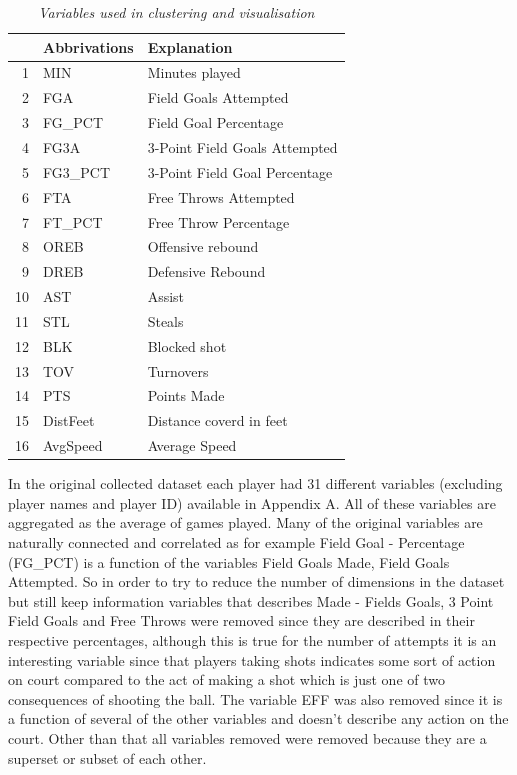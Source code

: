 \documentclass{article}
\begin{document}
\begin{table}[ht]
\centering
\begin{tabular}{rll}
  \hline
 & \textbf{Abbrivations} & \textbf{Explanation} \\ 
  \hline
1 & MIN & Minutes played \\ 
  2 & FGA & Field Goals Attempted \\ 
  3 & FG\_PCT & Field Goal Percentage \\ 
  4 & FG3A & 3-Point Field Goals Attempted \\ 
  5 & FG3\_PCT & 3-Point Field Goal Percentage \\ 
  6 & FTA & Free Throws Attempted \\ 
  7 & FT\_PCT & Free Throw Percentage \\ 
  8 & OREB & Offensive rebound \\ 
  9 & DREB & Defensive Rebound \\ 
  10 & AST & Assist \\ 
  11 & STL & Steals \\ 
  12 & BLK & Blocked shot \\ 
  13 & TOV & Turnovers \\ 
  14 & PTS & Points Made \\ 
  15 & DistFeet & Distance coverd in feet \\ 
  16 & AvgSpeed & Average Speed \\
   \hline
\end{tabular}
\caption{\textit{Variables used in clustering and visualisation}} 
\end{table}

In the original collected dataset each player had 31 different variables (excluding player names and player ID) available in Appendix A. All of these variables are aggregated as the average of games played. Many of the original variables are naturally connected and correlated as for example Field Goal - Percentage (FG\_PCT) is a function of the variables Field Goals Made, Field Goals Attempted. So in order to try to reduce the number of dimensions in the dataset but still keep information variables that describes Made - Fields Goals, 3 Point Field Goals and Free Throws were removed since they are described in their respective percentages, although this is true for the number of attempts it is an interesting variable since that players taking shots indicates some sort of action on court compared to the act of making a shot which is just one of two consequences of shooting the ball. The variable EFF was also removed since it is a function of several of the other variables and doesn't describe any action on the court. Other than that all variables removed were removed because they are a superset or subset of each other.
\end{document}
